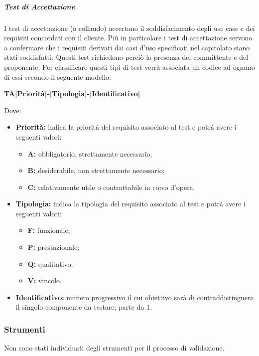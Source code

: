         \subparagraph*{Test di Accettazione}
            	I test di accettazione (o collaudo) accertano il soddisfacimento degli use case e dei requisiti concordati con il cliente.
                Più in particolare i test di accettazione servono a confermare che i requisiti derivati dai casi d'uso specificati nel capitolato siano stati soddisfatti. Questi test richiedono perciò la presenza del committente e del proponente.  
                Per classificare questi tipi di test verrà associata un codice ad ognuno di essi secondo il seguente modello:
                
                \begin{center}
                	\textbf{TA[Priorità]-[Tipologia]-[Identificativo]}
                \end{center}
                Dove: 
                
                \begin{itemize}
	                \item \textbf{Priorità:} indica la priorità del requisito associato al test e potrà avere i seguenti valori:
		                \begin{itemize}
		                    \item \textbf{A:} obbligatorio, strettamente necessario;
		                    \item \textbf{B:} desiderabile, non strettamente necessario;
		                    \item \textbf{C:} relativamente utile o contrattabile in corso d'opera. 
		                \end{itemize} 
	                \item \textbf{Tipologia:} indica la tipologia del requisito associato al test e potrà avere i seguenti valori:
		                \begin{itemize}
		                    \item \textbf{F:} funzionale;
		                    \item \textbf{P:} prestazionale;
		                    \item \textbf{Q:} qualitativo;
		                    \item \textbf{V:} vincolo.
		                \end{itemize}
	                \item \textbf{Identificativo:} numero progressivo il cui obiettivo sarà di contraddistinguere il singolo componente da testare; parte da 1.
                \end{itemize}
                
    \subsubsection{Strumenti}
        Non sono stati individuati degli strumenti per il processo di validazione.